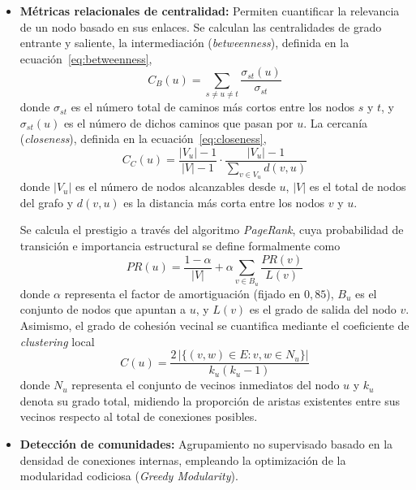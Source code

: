 \documentclass[conference,a4paper]{IEEEtran}
\begin{document}
\begin{itemize}
\item \textbf{Métricas relacionales de centralidad:} Permiten cuantificar 
la relevancia de un nodo basado en sus enlaces. Se calculan las 
centralidades de grado entrante y saliente, la intermediación 
(\emph{betweenness}), definida en la ecuación~\ref{eq:betweenness},
\begin{equation}
  \label{eq:betweenness}
  C_B(u) = \sum_{s \neq u \neq t} \frac{\sigma_{st}(u)}{\sigma_{st}}
\end{equation}
donde $\sigma_{st}$ es el número total de caminos más cortos entre 
los nodos $s$ y $t$, y $\sigma_{st}(u)$ es el número de dichos 
caminos que pasan por $u$. La cercanía (\emph{closeness}), definida 
en la ecuación~\ref{eq:closeness},
\begin{equation}
  \label{eq:closeness}
  C_C(u) = \frac{|V_u| - 1}{|V| - 1} \cdot \frac{|V_u| - 1}{\sum_{v \in V_u} d(v, u)}
\end{equation}
donde $|V_u|$ es el número de nodos alcanzables desde $u$, $|V|$ es 
el total de nodos del grafo y $d(v, u)$ es la distancia más corta 
entre los nodos $v$ y $u$.

Se calcula el prestigio a través del algoritmo \emph{PageRank}, cuya probabilidad de transición e importancia estructural se define formalmente como
\begin{equation}
  \label{eq:pagerank}
  PR(u) = \frac{1-\alpha}{|V|} + \alpha \sum_{v \in B_u} \frac{PR(v)}{L(v)}
\end{equation}
donde $\alpha$ representa el factor de amortiguación (fijado en $0{,}85$), $B_u$ es el conjunto de nodos que apuntan a $u$, y $L(v)$ es el grado de salida del nodo $v$. Asimismo, el grado de cohesión vecinal se cuantifica mediante el coeficiente de \emph{clustering} local
\begin{equation}
  \label{eq:clustering}
  C(u) = \frac{2 \, |\{ (v, w) \in E : v, w \in N_u \}|}{k_u (k_u - 1)}
\end{equation}
donde $N_u$ representa el conjunto de vecinos inmediatos del nodo $u$ y $k_u$ denota su grado total, midiendo la proporción de aristas existentes entre sus vecinos respecto al total de conexiones posibles.

\item \textbf{Detección de comunidades:} Agrupamiento no supervisado basado en la densidad de conexiones internas, empleando la optimización de la modularidad codiciosa (\emph{Greedy Modularity}).
\end{itemize}
\end{document}
